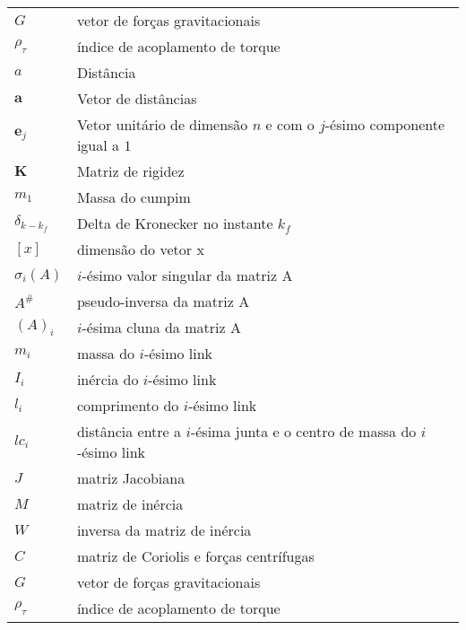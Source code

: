 \begin{xltabular}{\textwidth}{l X}
    $G$              & vetor de forças gravitacionais                                          \\
    $\rho_{\tau}$    & índice de acoplamento de torque                                         \\
    $a$              & Distância                                                               \\
    $\textbf{a}$     & Vetor de distâncias                                                     \\
    $\textbf{e}_{j}$ & Vetor unitário de dimensão $n$ e com o $j$-ésimo componente igual a $1$ \\
    $\textbf{K}$     & Matriz de rigidez                                                       \\
    $m_1$            & Massa do cumpim                                                         \\
    $\delta_{k-k_f}$ & Delta de Kronecker no instante $k_f$                                    \\
    $[x]$            & dimensão do vetor x                                                     \\
    $\sigma_{i}(A)$  & $i$-ésimo valor singular da matriz A                                    \\
    $A^{\#}$         & pseudo-inversa da matriz A                                              \\
    $(A)_{i}$        & $i$-ésima cluna da matriz A                                             \\
    $m_{i}$          & massa do $i$-ésimo link                                                 \\
    $I_{i}$          & inércia do $i$-ésimo link                                               \\
    $l_{i}$          & comprimento do $i$-ésimo link                                           \\
    $lc_{i}$         & distância entre a $i$-ésima junta e o centro de massa do $i$-ésimo link \\
    $J$              & matriz Jacobiana                                                        \\
    $M$              & matriz de inércia                                                       \\
    $W$              & inversa da matriz de inércia                                            \\
    $C$              & matriz de Coriolis e forças centrífugas                                 \\
    $G$              & vetor de forças gravitacionais                                          \\
    $\rho_{\tau}$    & índice de acoplamento de torque
\end{xltabular}
